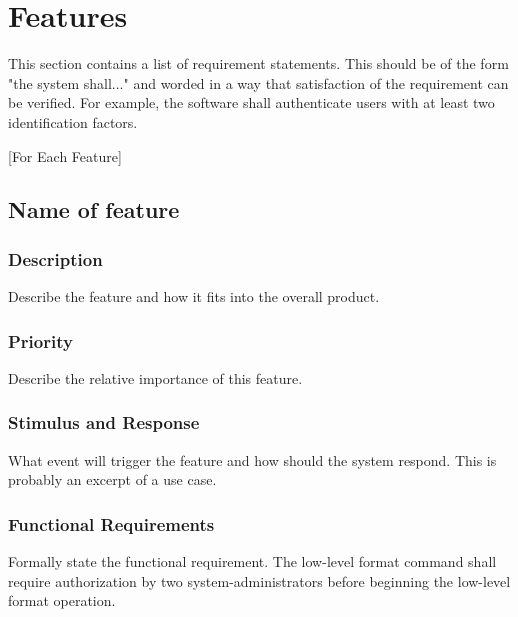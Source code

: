 \section{Features}
 This section contains a list of requirement statements.  This should be of the
 form "the system shall..."  and worded in a way that satisfaction of the
 requirement can be verified.  For example, the software shall authenticate
 users with at least two identification factors.  


 [For Each Feature]
\subsection{Name of feature}
\subsubsection{Description}
 Describe the feature and how it fits into the overall product.  

\subsubsection{Priority}
 Describe the relative importance of this feature. 

\subsubsection{Stimulus and Response}
 What event will trigger the feature and how should the system respond.  This
 is probably an excerpt of a use case. 

\subsubsection{Functional Requirements}
 Formally state the functional requirement.
 The low-level format command shall require authorization by two
 system-administrators before beginning the low-level format operation.

